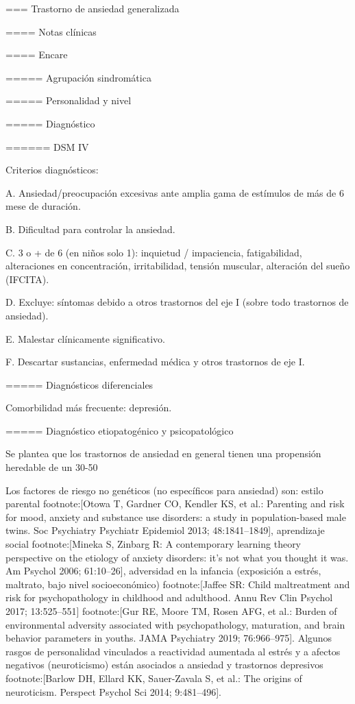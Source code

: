 === Trastorno de ansiedad generalizada

==== Notas clínicas

==== Encare

===== Agrupación sindromática

===== Personalidad y nivel

===== Diagnóstico

====== DSM IV

Criterios diagnósticos:

A. Ansiedad/preocupación excesivas ante amplia gama de estímulos de más de 6 mese de duración.

B. Dificultad para controlar la ansiedad.

C. 3 o + de 6 (en niños solo 1): inquietud / impaciencia, fatigabilidad, alteraciones en concentración, irritabilidad, tensión muscular, alteración del sueño (IFCITA).

D. Excluye: síntomas debido a otros trastornos del eje I (sobre todo trastornos de ansiedad).

E. Malestar clínicamente significativo.

F. Descartar sustancias, enfermedad médica y otros trastornos de eje I.

===== Diagnósticos diferenciales

Comorbilidad más frecuente: depresión.

===== Diagnóstico etiopatogénico y psicopatológico

Se plantea que los trastornos de ansiedad en general tienen una propensión heredable de un 30-50%

Los factores de riesgo no genéticos (no específicos para ansiedad) son: estilo parental footnote:[Otowa T, Gardner CO, Kendler KS, et al.: Parenting and risk for mood, anxiety and substance use disorders: a study in population-based male twins. Soc Psychiatry Psychiatr Epidemiol 2013; 48:1841–1849], aprendizaje social footnote:[Mineka S, Zinbarg R: A contemporary learning theory perspective on the etiology of anxiety disorders: it’s not what you thought it was. Am Psychol 2006; 61:10–26], adversidad en la infancia (exposición a estrés, maltrato, bajo nivel socioeconómico) footnote:[Jaffee SR: Child maltreatment and risk for psychopathology in childhood and adulthood. Annu Rev Clin Psychol 2017; 13:525–551] footnote:[Gur RE, Moore TM, Rosen AFG, et al.: Burden of environmental adversity associated with psychopathology, maturation, and brain behavior parameters in youths. JAMA Psychiatry 2019; 76:966–975]. Algunos rasgos de personalidad vinculados a reactividad aumentada al estrés y a afectos negativos (neuroticismo) están asociados a ansiedad y trastornos depresivos footnote:[Barlow DH, Ellard KK, Sauer-Zavala S, et al.: The origins of neuroticism. Perspect Psychol Sci 2014; 9:481–496].

